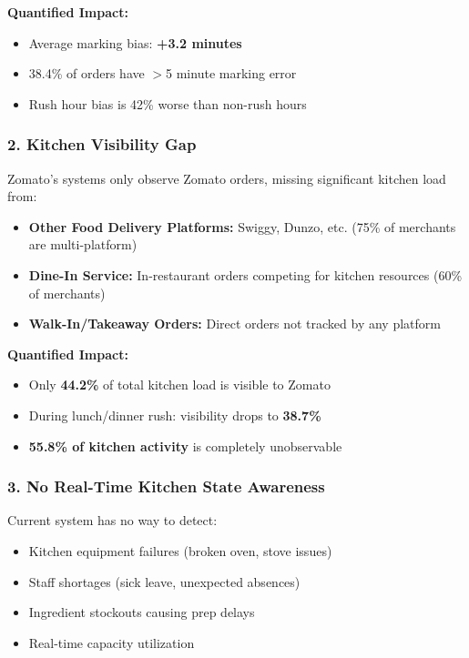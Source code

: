 \documentclass[11pt,a4paper]{article}
\begin{document}
\textbf{Quantified Impact:}
\begin{itemize}
    \item Average marking bias: \textbf{+3.2 minutes}
    \item 38.4\% of orders have $>$5 minute marking error
    \item Rush hour bias is 42\% worse than non-rush hours
\end{itemize}

\subsubsection{2. Kitchen Visibility Gap}

Zomato's systems only observe Zomato orders, missing significant kitchen load from:

\begin{itemize}[leftmargin=*]
    \item \textbf{Other Food Delivery Platforms:} Swiggy, Dunzo, etc. (75\% of merchants are multi-platform)
    \item \textbf{Dine-In Service:} In-restaurant orders competing for kitchen resources (60\% of merchants)
    \item \textbf{Walk-In/Takeaway Orders:} Direct orders not tracked by any platform
\end{itemize}

\textbf{Quantified Impact:}
\begin{itemize}
    \item Only \textbf{44.2\%} of total kitchen load is visible to Zomato
    \item During lunch/dinner rush: visibility drops to \textbf{38.7\%}
    \item \textbf{55.8\% of kitchen activity} is completely unobservable
\end{itemize}

\subsubsection{3. No Real-Time Kitchen State Awareness}

Current system has no way to detect:
\begin{itemize}[leftmargin=*]
    \item Kitchen equipment failures (broken oven, stove issues)
    \item Staff shortages (sick leave, unexpected absences)
    \item Ingredient stockouts causing prep delays
    \item Real-time capacity utilization
\end{itemize}
\end{document}
